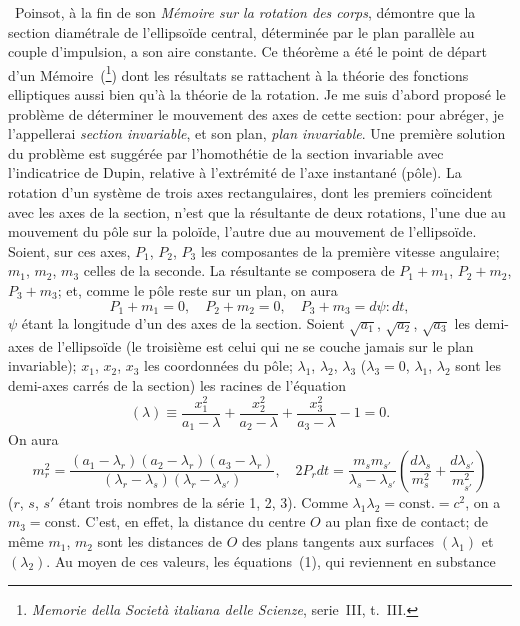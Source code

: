 \documentclass[11pt,leqno,oneside,letterpaper]{book}[2005/09/16]
\begin{document}
{\fg}~Poinsot, \`a la fin de son \textit{M\'emoire sur la rotation des corps}, d\'emontre que
la section diam\'etrale de l'ellipso\"ide central, d\'etermin\'ee par le plan parall\`ele
au couple d'impulsion, a son aire constante. Ce th\'eor\`eme a \'et\'e le point
de d\'epart d'un M\'emoire~(\footnote{
  \textit{Memorie della Societ\`a italiana delle Scienze}, serie~III, t.~III.})
dont les r\'esultats se rattachent \`a la th\'eorie des
fonctions elliptiques aussi bien qu'\`a la th\'eorie de la rotation. Je me suis
d'abord propos\'e le probl\`eme de d\'eterminer le mouvement des axes de cette
section: pour abr\'eger, je l'appellerai \textit{section invariable}, et son plan, \textit{plan
invariable}. Une premi\`ere solution du probl\`eme est sugg\'er\'ee par l'homoth\'etie
de la section invariable avec l'indicatrice de Dupin, relative \`a
l'extr\'emit\'e de l'axe instantan\'e (p\^ole). La rotation d'un syst\`eme de trois
axes rectangulaires, dont les premiers co\"incident avec les axes de la section,
n'est que la r\'esultante de deux rotations, l'une due au mouvement
du p\^ole sur la polo\"ide, l'autre due au mouvement de l'ellipso\"ide. Soient,
sur ces axes, $P_1$, $P_2$, $P_3$ les composantes de la premi\`ere vitesse angulaire;
$m_1$, $m_2$, $m_3$ celles de la seconde. La r\'esultante se composera de $P_1+m_1$,
$P_2+m_2$, $P_3+m_3$; et, comme le p\^ole reste sur un plan, on aura
\[
\tag{1}
  P_1+m_1 = 0,\quad
  P_2+m_2 = 0,\quad
  P_3+m_3 = d\psi:dt,
\]
$\psi$ \'etant la longitude d'un des axes de la section. Soient $\sqrt{a_1}$, $\sqrt{a_2}$, $\sqrt{a_3}$ les
demi-axes de l'ellipso\"ide (le troisi\`eme est celui qui ne se couche jamais sur
le plan invariable); $x_1$, $x_2$, $x_3$ les coordonn\'ees du p\^ole; $\lambda_1$, $\lambda_2$, $\lambda_3$ (${\lambda_3=0}$,
$\lambda_1$, $\lambda_2$ sont les demi-axes carr\'es de la section) les racines de l'\'equation
\[
(\lambda) \equiv
\frac{x_1^2}{a_1-\lambda} +\frac{x_2^2}{a_2-\lambda} +\frac{x_3^2}{a_3-\lambda}-1=0.
\]
On aura
\[
m_r^2= \frac{(a_1-\lambda_r)(a_2-\lambda_r)(a_3-\lambda_r)
  }{(\lambda_r-\lambda_s)(\lambda_r-\lambda_{s'})},
\quad
2P_r dt=\frac{m_s m_{s'}}{\lambda_s-\lambda_{s'}}
\left(\frac{d\lambda_s}{m^2_s} +\frac{d\lambda_{s'}}{m^2_{s'}}\right)
\]
($r$, $s$, $s'$ \'etant trois nombres de la s\'erie 1, 2, 3). Comme $\lambda_1\lambda_2 = \textrm{const.}= c^2$, on
a ${m_3 = \textrm{const}}$. C'est, en effet, la distance du centre $O$ au plan fixe de contact;
de m\^eme $m_1$, $m_2$ sont les distances de $O$ des plans tangents aux surfaces $(\lambda_1)$ et $(\lambda_2)$. Au moyen de ces valeurs, les \'equations~(1), qui reviennent en substance
\end{document}
